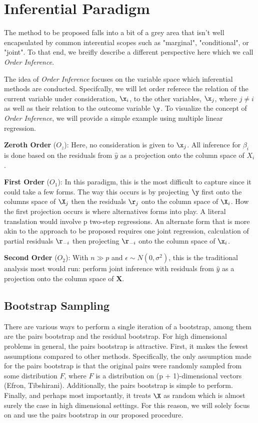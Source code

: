 \section{Inferential Paradigm}

The method to be proposed falls into a bit of a grey area that isn't well encapsulated by common interential scopes such as "marginal", "conditional", or "joint". To that end, we breifly describe a different perspective here which we call \textit{Order Inference}.

The idea of \textit{Order Inference} focuses on the variable space which inferential methods are conducted. Specifcally, we will let order referece the relation of the current variable under consideration, $\x_i$, to the other variables, $\x_j$, where $j \neq i$ as well as their relation to the outcome variable $\y$. To visualize the concept of \textit{Order Inference}, we will provide a simple example using multiple linear regression.

\textbf{Zeroth Order} ($O_z$): Here, no consideration is given to $\x_j$. All inference for $\beta_i$ is done based on the residuals from $\hat{y}$ as a projection onto the column space of $X_i$.

\textbf{First Order} ($O_1$): In this paradigm, this is the most difficult to capture since it could take a few forms. The way this occurs is by projecting $\y$ first onto the columns space of $\X_j$ then the residuals $\r_j$ onto the column space of $\X_i$. How the first projection occurs is where alternatives forms into play. A literal translation would involve p two-step regressions. An alternate form that is more akin to the approach to be proposed requires one joint regression, calculation of partial residuals $\r_{-i}$ then projecting $\r_{-i}$ onto the column space of $\x_i$.

\textbf{Second Order} ($O_2$): With $n \gg p$ and $\epsilon \sim N(0, \sigma^2)$, this is the traditional analysis most would run: perform joint inference with residuals from $\hat{y}$ as a projection onto the column space of $\boldsymbol{X}$.

\subsection{Bootstrap Sampling}

There are various ways to perform a single iteration of a bootstrap, among them are the pairs bootstrap and the residual bootstrap. For high dimensional problems in general, the pairs bootstrap is attractive. First, it makes the fewest assumptions compared to other methods. Specifically, the only assumption made for the pairs bootstrap is that the original pairs were randomly sampled from some distribution $F$, where $F$ is a distribution on (p + 1)-dimensional vectors (Efron, Tibshirani). Additionally, the pairs bootstrap is simple to perform. Finally, and perhaps most importantly, it treats $\X$ as random which is almost surely the case in high dimensional settings. For this reason, we will solely focus on and use the pairs bootstrap in our proposed procedure.


